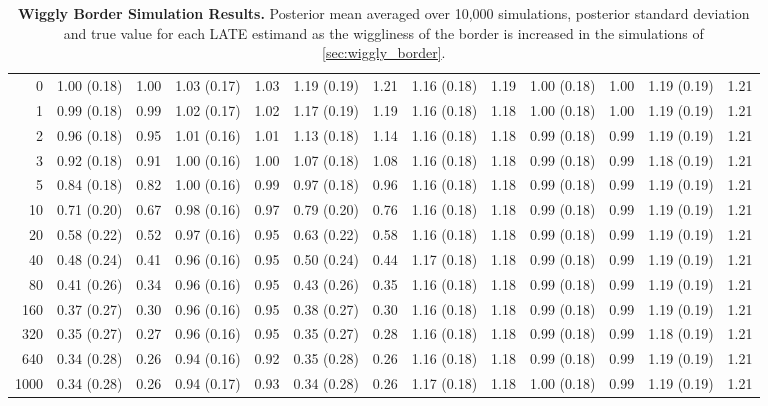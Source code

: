 \begin{landscape}
\begin{table}[p]
\begin{tabular}{r|rrrrrrrrrrrr}
 0    & 1.00 (0.18) & 1.00 & 1.03 (0.17) & 1.03 & 1.19 (0.19) & 1.21 & 1.16 (0.18) & 1.19 & 1.00 (0.18) & 1.00 & 1.19 (0.19) & 1.21 \\
 1    & 0.99 (0.18) & 0.99 & 1.02 (0.17) & 1.02 & 1.17 (0.19) & 1.19 & 1.16 (0.18) & 1.18 & 1.00 (0.18) & 1.00 & 1.19 (0.19) & 1.21 \\
 2    & 0.96 (0.18) & 0.95 & 1.01 (0.16) & 1.01 & 1.13 (0.18) & 1.14 & 1.16 (0.18) & 1.18 & 0.99 (0.18) & 0.99 & 1.19 (0.19) & 1.21 \\
 3    & 0.92 (0.18) & 0.91 & 1.00 (0.16) & 1.00 & 1.07 (0.18) & 1.08 & 1.16 (0.18) & 1.18 & 0.99 (0.18) & 0.99 & 1.18 (0.19) & 1.21 \\
 5    & 0.84 (0.18) & 0.82 & 1.00 (0.16) & 0.99 & 0.97 (0.18) & 0.96 & 1.16 (0.18) & 1.18 & 0.99 (0.18) & 0.99 & 1.19 (0.19) & 1.21 \\
 10   & 0.71 (0.20) & 0.67 & 0.98 (0.16) & 0.97 & 0.79 (0.20) & 0.76 & 1.16 (0.18) & 1.18 & 0.99 (0.18) & 0.99 & 1.19 (0.19) & 1.21 \\
 20   & 0.58 (0.22) & 0.52 & 0.97 (0.16) & 0.95 & 0.63 (0.22) & 0.58 & 1.16 (0.18) & 1.18 & 0.99 (0.18) & 0.99 & 1.19 (0.19) & 1.21 \\
 40   & 0.48 (0.24) & 0.41 & 0.96 (0.16) & 0.95 & 0.50 (0.24) & 0.44 & 1.17 (0.18) & 1.18 & 0.99 (0.18) & 0.99 & 1.19 (0.19) & 1.21 \\
 80   & 0.41 (0.26) & 0.34 & 0.96 (0.16) & 0.95 & 0.43 (0.26) & 0.35 & 1.16 (0.18) & 1.18 & 0.99 (0.18) & 0.99 & 1.19 (0.19) & 1.21 \\
 160  & 0.37 (0.27) & 0.30 & 0.96 (0.16) & 0.95 & 0.38 (0.27) & 0.30 & 1.16 (0.18) & 1.18 & 0.99 (0.18) & 0.99 & 1.19 (0.19) & 1.21 \\
 320  & 0.35 (0.27) & 0.27 & 0.96 (0.16) & 0.95 & 0.35 (0.27) & 0.28 & 1.16 (0.18) & 1.18 & 0.99 (0.18) & 0.99 & 1.18 (0.19) & 1.21 \\
 640  & 0.34 (0.28) & 0.26 & 0.94 (0.16) & 0.92 & 0.35 (0.28) & 0.26 & 1.16 (0.18) & 1.18 & 0.99 (0.18) & 0.99 & 1.19 (0.19) & 1.21 \\
 1000 & 0.34 (0.28) & 0.26 & 0.94 (0.17) & 0.93 & 0.34 (0.28) & 0.26 & 1.17 (0.18) & 1.18 & 1.00 (0.18) & 0.99 & 1.19 (0.19) & 1.21 \\
            \hline
        \end{tabular}
        \caption{
            \textbf{Wiggly Border Simulation Results.}
            Posterior mean averaged over 10,000 simulations, posterior standard deviation and true value for each LATE estimand as the wiggliness of the border is increased in the simulations of \autoref{sec:wiggly_border}.
            \label{table:wiggly_results}
            }
    \end{table}
\end{landscape}

